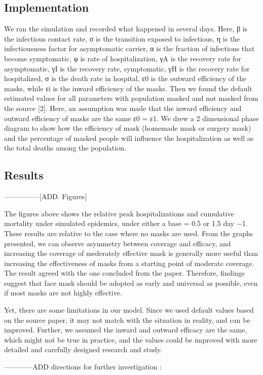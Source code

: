 \documentclass{article}
\begin{document}
\subsection{Implementation}

We ran the simulation and recorded what happened in several days. Here, β is the infectious contact rate, σ is the transition exposed to infectious, η is the infectiousness factor for asymptomatic carrier, α is the fraction of infections that become symptomatic, φ is rate of hospitalization, γA is the recovery rate for asymptomatic, γI is the recovery rate, symptomatic, γH is the recovery rate for hospitalized, σ is the death rate in hospital, ε0 is the outward efficiency of the masks, while εi is the inward efficiency of the masks.
Then we found the default estimated values for all parameters with population masked and not masked from the source [2]. Here, an assumption was made that the inward efficiency and outward efficiency of masks are the same ε0 = ε1. We drew a 2 dimensional phase diagram to show how the efficiency of mask (homemade mask or surgery mask) and the percentage of masked people will influence the hospitalization as well as the total deaths among the population.


\subsection{Results}
---------------[ADD. Figures]

The figures above shows the relative peak hospitalizations and cumulative mortality under simulated epidemics, under either a base  = 0.5 or 1.5 day −1. These results are relative to the case where no masks are used. From the graphs presented, we can observe asymmetry between coverage and efficacy, and increasing the coverage of mederately effective mask is generally more useful than increasing the effectiveness of masks from a starting point of moderate coverage. The result agreed with the one concluded from the paper. Therefore, findings suggest that face mask should be adopted as early and universal as possible, even if most masks are not highly effective.

Yet, there are some limitations in our model. Since we used default values based on the source paper, it may not match with the situation in reality, and can be improved. Further, we assumed the inward and outward efficacy are the same, which might not be true in practice, and the values could be improved with more detailed and carefully designed research and study.



------------ADD directions for further investigation :
\end{document}
